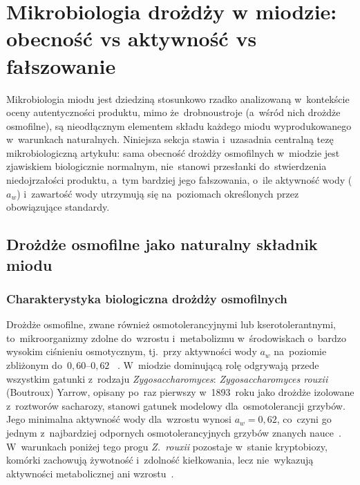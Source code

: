 
\section{Mikrobiologia drożdży w miodzie:
obecność vs aktywność vs fałszowanie}

Mikrobiologia miodu jest dziedziną stosunkowo rzadko analizowaną
w~kontekście oceny autentyczności produktu, mimo że~drobnoustroje
(a~wśród nich drożdże osmofilne), są nieodłącznym elementem
składu każdego miodu wyprodukowanego w~warunkach naturalnych.
Niniejsza sekcja stawia i~uzasadnia centralną tezę mikrobiologiczną
artykułu: sama obecność drożdży osmofilnych w~miodzie jest zjawiskiem
biologicznie normalnym, nie~stanowi przesłanki do~stwierdzenia
niedojrzałości produktu, a~tym bardziej jego fałszowania, o~ile
aktywność wody ($a_w$) i~zawartość wody utrzymują się na~poziomach
określonych przez obowiązujące standardy.

\subsection{Drożdże osmofilne jako naturalny składnik miodu}

\subsubsection{Charakterystyka biologiczna drożdży osmofilnych}

Drożdże osmofilne, zwane również osmotolerancyjnymi lub
kserotolerantnymi, to~mikroorganizmy zdolne do~wzrostu i~metabolizmu
w~środowiskach o~bardzo wysokim ciśnieniu osmotycznym, tj.~przy
aktywności wody $a_w$ na~poziomie zbliżonym do~$0{,}60$--$0{,}62$
~\cite{ruegg1981,waaw2006}. W~miodzie dominującą rolę odgrywają
przede wszystkim gatunki z~rodzaju \textit{Zygosaccharomyces}:
\textit{Zygosaccharomyces rouxii} (Boutroux) Yarrow, opisany
po~raz pierwszy w~1893~roku jako drożdże izolowane z~roztworów
sacharozy, stanowi gatunek modelowy dla~osmotolerancji
grzybów. Jego minimalna aktywność wody
dla~wzrostu wynosi $a_w = 0{,}62$, co~czyni go jednym
z~najbardziej odpornych osmotolerancyjnych grzybów znanych
nauce~\cite{waaw2006}. W~warunkach poniżej tego progu
\textit{Z.~rouxii} pozostaje w~stanie kryptobiozy, komórki
zachowują żywotność i~zdolność kiełkowania, lecz nie~wykazują
aktywności metabolicznej ani wzrostu~\cite{waaw2006,ruegg1981}.

